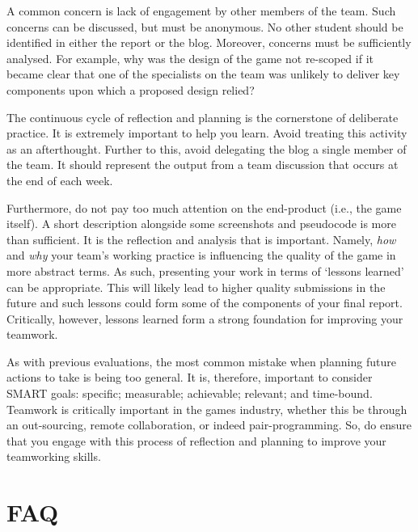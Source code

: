 \documentclass{../fal_assignment}
\begin{document}
A common concern is lack of engagement by other members of the team. Such concerns can be discussed, but must be anonymous. No other student should be identified in either the report or the blog. Moreover, concerns must be sufficiently analysed. For example, why was the design of the game not re-scoped if it became clear that one of the specialists on the team was unlikely to deliver key components upon which a proposed design relied?

The continuous cycle of reflection and planning is the cornerstone of deliberate practice. It is extremely important to help you learn. Avoid treating this activity as an afterthought. Further to this, avoid delegating the blog a single member of the team. It should represent the output from a team discussion that occurs at the end of each week. 

Furthermore, do not pay too much attention on the end-product (i.e., the game itself). A short description alongside some screenshots and pseudocode is more than sufficient. It is the reflection and analysis that is important. Namely, \textit{how} and \textit{why} your team's working practice is influencing the quality of the game in more abstract terms. As such, presenting your work in terms of `lessons learned' can be appropriate. This will likely lead to higher quality submissions in the future and such lessons could form some of the components of your final report. Critically, however, lessons learned form a strong foundation for improving your teamwork.

As with previous evaluations, the most common mistake when planning future actions to take is being too general. It is, therefore, important to consider SMART goals: specific; measurable; achievable; relevant; and time-bound. Teamwork is critically important in the games industry, whether this be through an out-sourcing, remote collaboration, or indeed pair-programming. So, do ensure that you engage with this process of reflection and planning to improve your teamworking skills.

\section*{FAQ}
\end{document}
